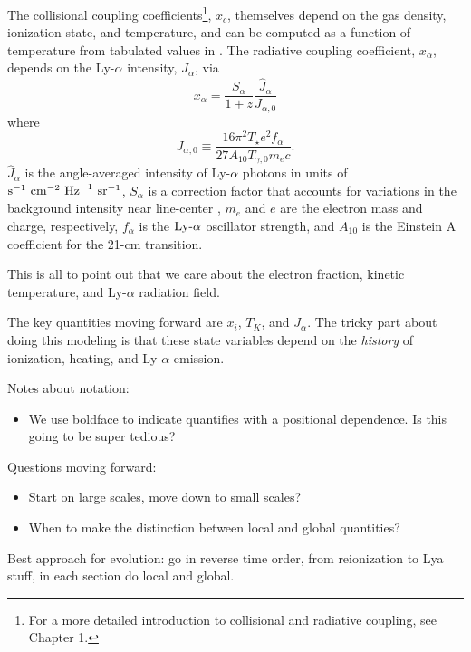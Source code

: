The collisional coupling coefficients\footnote{For a more detailed introduction to collisional and radiative coupling, see Chapter 1.}, $x_c$, themselves depend on the gas density, ionization state, and temperature, and can be computed as a function of temperature from tabulated values in \cite{Zygelman2005}. The radiative coupling coefficient, $x_{\alpha}$, depends on the Ly-$\alpha$ intensity, $J_{\alpha}$, via
\begin{equation}
    x_{\alpha} = \frac{S_{\alpha}}{1+z} \frac{\hat{J}_{\alpha}}{{J}_{\alpha,0}} \label{eq:Jalpha}
\end{equation}
where
\begin{equation}
    J_{\alpha,0} \equiv \frac{16\pi^2 T_{\star} e^2 f_{\alpha}}{27 A_{10} T_{\gamma,0} m_e c} . 
\end{equation}
$\hat{J}_{\alpha}$ is the angle-averaged intensity of Ly-$\alpha$ photons in
units of $\text{s}^{-1} \ \text{cm}^{-2} \ \mathrm{Hz}^{-1} \ \text{sr}^{-1}$, $S_{\alpha}$ is a correction factor that
accounts for variations in the background intensity near line-center
\cite{Chen2004,FurlanettoPritchard2006,Hirata2006}, $m_e$ and $e$ are the
electron mass and charge, respectively, $f_{\alpha}$ is the $\text{Ly-}\alpha$ oscillator
strength, and $A_{10}$ is the Einstein A coefficient for the 21-cm transition.

This is all to point out that we care about the electron fraction, kinetic temperature, and Ly-$\alpha$ radiation field.

The key quantities moving forward are $x_i$, $T_K$, and $J_{\alpha}$. The tricky part about doing this modeling is that these state variables depend on the \textit{history} of ionization, heating, and Ly-$\alpha$ emission. 

Notes about notation:
\begin{itemize}
	\item We use boldface to indicate quantifies with a positional dependence. Is this going to be super tedious?
\end{itemize}

Questions moving forward:
\begin{itemize}
	\item Start on large scales, move down to small scales?
	\item When to make the distinction between local and global quantities?
\end{itemize}

Best approach for evolution: go in reverse time order, from reionization to Lya stuff, in each section do local and global.


